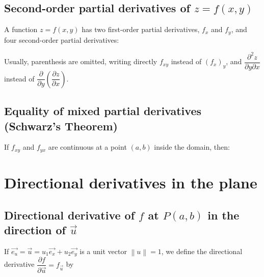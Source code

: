 \documentclass{article}
\begin{document}
\subsection{Second-order partial derivatives of $z = f(x,y)$}
A function $z=f(x,y)$ has two first-order partial derivatives, $f_x$ and $f_y$,
and four second-order partial derivatives:

Usually, parenthesis are omitted, writing directly $f_{xy}$ instead of $(f_x)_y$, and $\dfrac{\partial^2 z}{\partial y \partial x}$
instead of $\dfrac{\partial}{\partial y} \left(\dfrac{\partial z}{\partial x}\right)$.

\subsection{Equality of mixed partial derivatives (Schwarz's Theorem)}
If $f_{xy}$ and $f_{yx}$ are continuous at a point $(a,b)$ inside the domain, then:

\newpage
\section{Directional derivatives in the plane}
\subsection[Directional derivative of f at P(a,b) in the direction of u]
{Directional derivative of $f$ at $P(a,b)$ in the direction of $\overrightarrow{u}$}

If $\overrightarrow{e_u} = \overrightarrow{u} = u_1\overrightarrow{e_x} + u_2\overrightarrow{e_y}$
is a unit vector $\left\lVert u \right\rVert = 1$, we define the
directional derivative $\dfrac{\partial f}{\partial \overrightarrow{u}} = f_{\overrightarrow{u}}$ by
\end{document}
